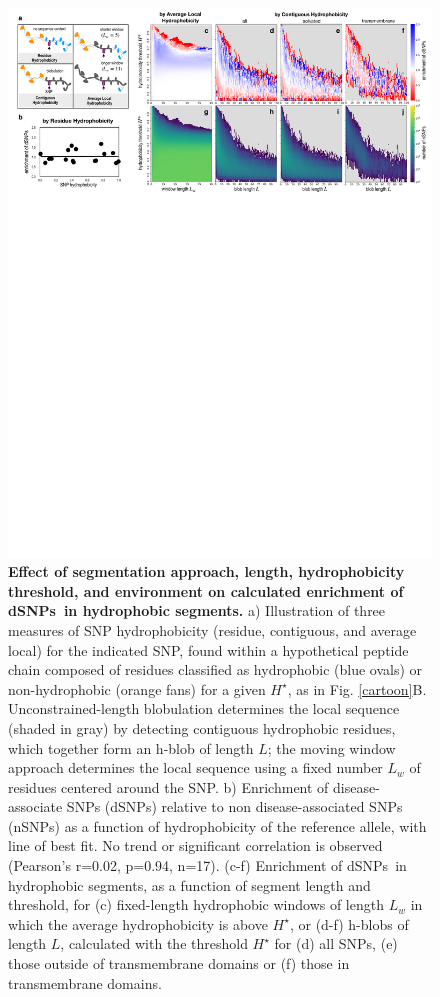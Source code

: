 \documentclass[9pt,twocolumn,twoside,lineno]{pnas-new}
\newcommand{\inserted}[1]{{#1}}
\newcommand{\dSNPs}{dSNPs~}
\newcommand{\Ht}{H^{\star}}
\begin{document}
\begin{figure}
\includegraphics[scale=1,width=\textwidth,trim={0 0cm 0 0cm},clip]{fig2.pdf}
\caption{{\bf Effect of segmentation approach, length,  hydrophobicity threshold, and environment on calculated enrichment of \dSNPs in hydrophobic segments.} a) Illustration of three measures of SNP hydrophobicity (residue, contiguous, and average local) for the indicated SNP, found within a hypothetical peptide chain composed of residues classified as hydrophobic (blue ovals) or non-hydrophobic (orange fans) for a given $\Ht$, as in Fig. \ref{cartoon}B. Unconstrained-length blobulation determines the local sequence (shaded in gray) by detecting contiguous hydrophobic residues, which together form an h-blob of length $L$; the moving window approach determines the local sequence using a fixed number $L_w$ of residues centered around the SNP. b) Enrichment of disease-associate SNPs (dSNPs) relative to non disease-associated SNPs (nSNPs) as a function of hydrophobicity of the reference allele, with line of best fit. No trend or significant correlation is observed (Pearson's r=0.02, p=0.94, n=17). (c-f) Enrichment of \dSNPs in hydrophobic segments, as a function of segment length and threshold, for (c) fixed-length hydrophobic windows of length $L_w$ in which the average hydrophobicity is above $\Ht$, or (d-f) h-blobs of length $L$, calculated with the threshold $\Ht$ for (d) all SNPs, \inserted{(e) those outside of transmembrane domains or (f) those in transmembrane domains.}
}
\end{figure}
\end{document}
